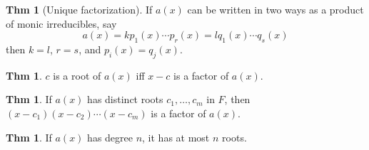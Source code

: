 \documentclass{article}
\theoremstyle{definition}
\newtheorem{theorem}[definition]{Thm}
\begin{document}
\begin{theorem}[Unique factorization]
    If $a(x)$ can be written in two ways as a product of monic irreducibles, say
    $$a(x) = k p_1(x) \cdots p_r(x) = l q_1(x) \cdots q_s(x)$$
    then $k=l$, $r=s$, and $p_i(x) = q_j(x)$.
\end{theorem}

\begin{theorem}
    $c$ is a root of $a(x)$ iff $x - c$ is a factor of $a(x)$.
\end{theorem}
\begin{theorem}
    If $a(x)$ has distinct roots $c_1, \ldots, c_m$ in $F$, then $(x-c_1)(x-c_2)\cdots(x-c_m)$ is a factor of $a(x)$.
\end{theorem}

\begin{theorem}
    If $a(x)$ has degree $n$, it has at most $n$ roots.
\end{theorem}


\end{document}
